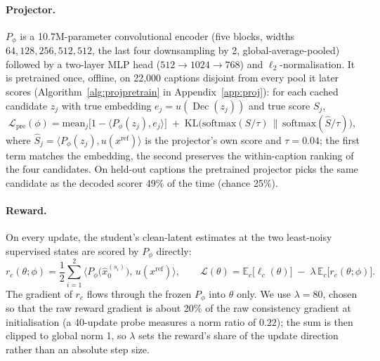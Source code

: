 \documentclass{article} %
\DeclareMathOperator{\Dec}{Dec}
\begin{document}
\paragraph{Projector.} $P_\phi$ is a 10.7M-parameter convolutional encoder (five blocks, widths
$64,128,256,512,512$, the last four downsampling by 2, global-average-pooled) followed by a two-layer MLP
head ($512{\to}1024{\to}768$) and $\ell_2$-normalisation. It is pretrained once, offline, on 22,000
captions disjoint from every pool it later scores (Algorithm~\ref{alg:projpretrain} in
Appendix~\ref{app:proj}): for each cached candidate $z_j$ with true embedding $e_j=u(\Dec(z_j))$ and true
score $S_j$,
\begin{equation}
\mathcal L_{\mathrm{pre}}(\phi)=\mathrm{mean}_j\big[1-\langle P_\phi(z_j),e_j\rangle\big]\;+\;\mathrm{KL}\Big(\mathrm{softmax}(S/\tau)\,\big\|\,\mathrm{softmax}(\hat S/\tau)\Big),
\label{eq:projpretrain}
\end{equation}
where $\hat S_j=\langle P_\phi(z_j),u(x^{\mathrm{ref}})\rangle$ is the projector's own score and $\tau{=}0.04$; the first term matches the embedding, the second preserves the within-caption ranking
of the four candidates. On held-out captions the pretrained projector picks the same candidate as the
decoded scorer 49\% of the time (chance 25\%).

\paragraph{Reward.} On every update, the student's clean-latent estimates at the two least-noisy supervised
states are scored by $P_\phi$ directly:
\begin{equation}
r_c(\theta;\phi)=\frac12\sum_{i=1}^{2}\big\langle P_\phi\big(\hat x_0^{(s_i)}\big),\,u(x^{\mathrm{ref}})\big\rangle ,
\qquad
\mathcal L(\theta)=\mathbb E_c\big[\ell_c(\theta)\big]\;-\;\lambda\,\mathbb E_c\big[r_c(\theta;\phi)\big] .
\label{eq:objective}
\end{equation}
The gradient of $r_c$ flows through the frozen $P_\phi$ into $\theta$ only. We use $\lambda{=}80$, chosen so
that the raw reward gradient is about 20\% of the raw consistency gradient at initialisation (a
40-update probe measures a norm ratio of $0.22$); the sum is then clipped to global norm 1, so $\lambda$
sets the reward's share of the update direction rather than an absolute step size.
\end{document}

